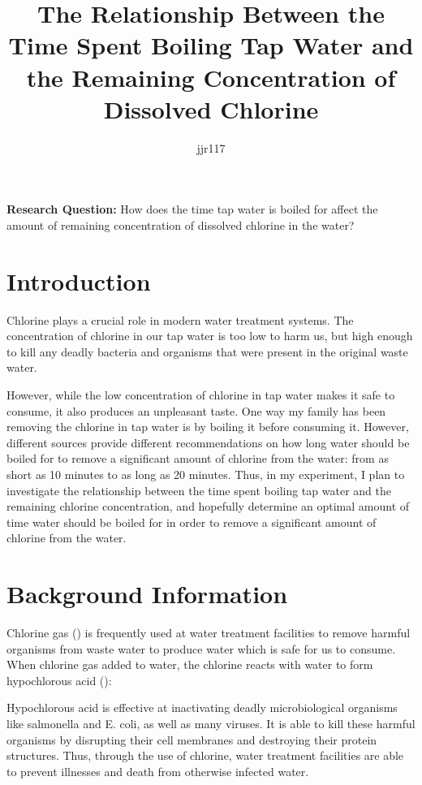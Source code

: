 \documentclass[11pt]{article}
\title{The Relationship Between the Time Spent Boiling Tap Water and the Remaining Concentration of Dissolved Chlorine}
\author{jjr117}
\date{}
\begin{document}
\begin{titlingpage}
	\maketitle
\end{titlingpage}

\noindent\textbf{Research Question:} How does the time tap water is boiled for affect the amount of remaining concentration of dissolved chlorine in the water?

\section{Introduction}

Chlorine plays a crucial role in modern water treatment systems. The concentration of chlorine in our tap water is too low to harm us, but high enough to kill any deadly bacteria and organisms that were present in the original waste water.

However, while the low concentration of chlorine in tap water makes it safe to consume, it also produces an unpleasant taste. One way my family has been removing the chlorine in tap water is by boiling it before consuming it. However, different sources provide different recommendations on how long water should be boiled for to remove a significant amount of chlorine from the water: from as short as 10 minutes to as long as 20 minutes. Thus, in my experiment, I plan to investigate the relationship between the time spent boiling tap water and the remaining chlorine concentration, and hopefully determine an optimal amount of time water should be boiled for in order to remove a significant amount of chlorine from the water.

\section{Background Information}

Chlorine gas () is frequently used at water treatment facilities to remove harmful organisms from waste water to produce water which is safe for us to consume. When chlorine gas added to water, the chlorine reacts with water to form hypochlorous acid ():

\centerline{}

Hypochlorous acid is effective at inactivating deadly microbiological organisms like salmonella and E. coli, as well as many viruses. It is able to kill these harmful organisms by disrupting their cell membranes and destroying their protein structures. Thus, through the use of chlorine, water treatment facilities are able to prevent illnesses and death from otherwise infected water.
\end{document}
